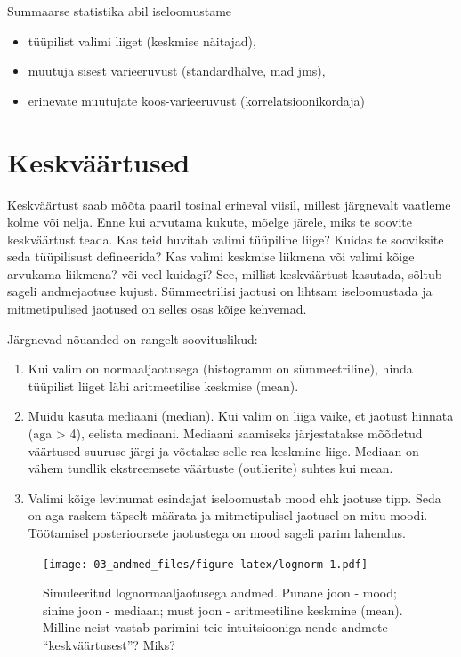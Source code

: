 \documentclass[]{book}
\providecommand{\tightlist}{%
  \setlength{\itemsep}{0pt}\setlength{\parskip}{0pt}}
\begin{document}
Summaarse statistika abil iseloomustame

\begin{itemize}
\tightlist
\item
  tüüpilist valimi liiget (keskmise näitajad),
\item
  muutuja sisest varieeruvust (standardhälve, mad jms),
\item
  erinevate muutujate koos-varieeruvust (korrelatsioonikordaja)
\end{itemize}

\section*{Keskväärtused}\label{keskvaartused}

Keskväärtust saab mõõta paaril tosinal erineval viisil, millest
järgnevalt vaatleme kolme või nelja. Enne kui arvutama kukute, mõelge
järele, miks te soovite keskväärtust teada. Kas teid huvitab valimi
tüüpiline liige? Kuidas te sooviksite seda tüüpilisust defineerida? Kas
valimi keskmise liikmena või valimi kõige arvukama liikmena? või veel
kuidagi? See, millist keskväärtust kasutada, sõltub sageli andmejaotuse
kujust. Sümmeetrilisi jaotusi on lihtsam iseloomustada ja mitmetipulised
jaotused on selles osas kõige kehvemad.

Järgnevad nõuanded on rangelt soovituslikud:

\begin{enumerate}
\def\labelenumi{(\arabic{enumi})}
\item
  Kui valim on normaaljaotusega (histogramm on sümmeetriline), hinda
  tüüpilist liiget läbi aritmeetilise keskmise (mean).
\item
  Muidu kasuta mediaani (median). Kui valim on liiga väike, et jaotust
  hinnata (aga \textgreater{} 4), eelista mediaani. Mediaani saamiseks
  järjestatakse mõõdetud väärtused suuruse järgi ja võetakse selle rea
  keskmine liige. Mediaan on vähem tundlik ekstreemsete väärtuste
  (outlierite) suhtes kui mean.
\item
  Valimi kõige levinumat esindajat iseloomustab mood ehk jaotuse tipp.
  Seda on aga raskem täpselt määrata ja mitmetipulisel jaotusel on mitu
  moodi. Töötamisel posterioorsete jaotustega on mood sageli parim
  lahendus.
\end{enumerate}






\begin{figure}
\centering
\texttt{[image: 03\_andmed\_files/figure-latex/lognorm-1.pdf]}
\caption{\label{fig:lognorm}Simuleeritud lognormaaljaotusega andmed. Punane joon -
mood; sinine joon - mediaan; must joon - aritmeetiline keskmine (mean).
Milline neist vastab parimini teie intuitsiooniga nende andmete
``keskväärtusest''? Miks?}
\end{figure}
\end{document}
